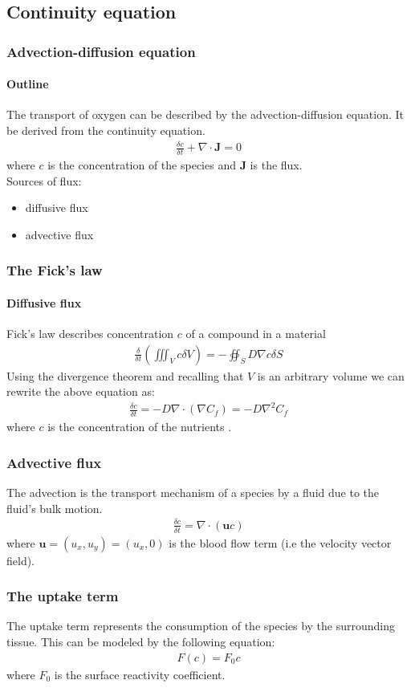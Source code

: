\documentclass{beamer}
\begin{document}
\subsection{Continuity equation}
\begin{frame}
\frametitle{Advection-diffusion equation}
\framesubtitle{Outline}
The transport of oxygen can be described by the advection-diffusion equation. It be derived from the \alert{continuity equation}.
\begin{align*}
\frac{\delta c}{\delta t}+\nabla \cdot \mathbf{J}=0
\end{align*}
where $c$ is the concentration of the species and $\mathbf{J}$ is the flux. \\
Sources of flux:
\begin{itemize}
\item diffusive flux
\item advective flux
\end{itemize}
\end{frame}

\begin{frame}
\frametitle{The Fick's law}
\framesubtitle{Diffusive flux}
Fick's law describes concentration $c $ of a compound in a material
\begin{align*}
\frac{\delta}{\delta t}\left(\iiint_V c \delta V\right)=-\oiint_S D \nabla c \delta S
\end{align*}
 Using the divergence theorem and recalling that $V$ is an arbitrary volume we can rewrite the above equation as:
\begin{align*}
\frac{\delta c}{\delta t} =-D \nabla \cdot \left( \nabla C_f\right) =-D\nabla^2 C_f
\end{align*}
where $c$ is the concentration of the nutrients .
\end{frame}

\begin{frame}
\frametitle{Advective flux}
The advection is the transport mechanism of a species  by a fluid due to the fluid's bulk motion. \begin{align*}
\frac{\delta c}{\delta t}=\nabla \cdot ( \mathbf{u}c)
\end{align*}
where $\mathbf{u}=(u_x, u_y)=(u_x,0)$ is the blood flow term (i.e the velocity vector field). 
\end{frame}


\begin{frame}
\frametitle{The uptake term}
The uptake term  represents the consumption of the species by the surrounding tissue. This can be modeled by the following equation:
\begin{align*}
F(c)=F_0c
\end{align*}
where $F_0$ is the surface reactivity coefficient.

\end{frame}
\end{document}
